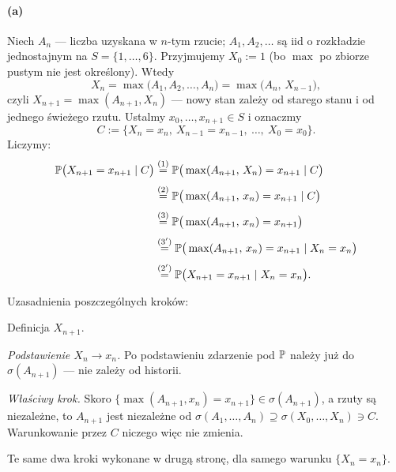 \documentclass[dvipsnames]{book}
\begin{document}
\paragraph{(a)} Niech $A_n$ --- liczba uzyskana w $n$-tym rzucie; $A_1, A_2,
\ldots$ są iid o rozkładzie jednostajnym na $S = \{1, \ldots, 6\}$. Przyjmujemy
$X_0 := 1$ (bo $\max$ po zbiorze pustym nie jest określony). Wtedy
\[
  X_n = \max\big(A_1, A_2, \ldots, A_n\big) = \max\big(A_n,\, X_{n-1}\big),
\]
czyli $X_{n+1} = \max(A_{n+1}, X_n)$ --- nowy stan zależy od starego stanu i od
jednego świeżego rzutu. Ustalmy $x_0, \ldots, x_{n+1} \in S$ i oznaczmy
\[
  C := \{X_n = x_n,\ X_{n-1} = x_{n-1},\ \ldots,\ X_0 = x_0\}.
\]
Liczymy:
\begin{align*}
  \P\big(X_{n+1} = x_{n+1} \mid C\big)
  &\overset{(1)}{=} \P\big(\max(A_{n+1},\, X_n) = x_{n+1} \mid C\big) \\[1mm]
  &\overset{(2)}{=} \P\big(\max(A_{n+1},\, x_n) = x_{n+1} \mid C\big) \\[1mm]
  &\overset{(3)}{=} \P\big(\max(A_{n+1},\, x_n) = x_{n+1}\big) \\[1mm]
  &\overset{(3')}{=} \P\big(\max(A_{n+1},\, x_n) = x_{n+1} \mid X_n = x_n\big) \\[1mm]
  &\overset{(2')}{=} \P\big(X_{n+1} = x_{n+1} \mid X_n = x_n\big).
\end{align*}

Uzasadnienia poszczególnych kroków:
\begin{description}[topsep=2pt,itemsep=1pt,leftmargin=10mm]
  \item[(1)] Definicja $X_{n+1}$.

  \item[(2)] \emph{Podstawienie $X_n \to x_n$.} Po podstawieniu zdarzenie pod $\P$ należy już do
  $\sigma(A_{n+1})$ --- nie zależy od historii.

  \item[(3)] \emph{Właściwy krok.} Skoro
  $\{\max(A_{n+1}, x_n) = x_{n+1}\} \in \sigma(A_{n+1})$, a rzuty są niezależne,
  to $A_{n+1}$ jest niezależne od
  $\sigma(A_1, \ldots, A_n) \supseteq \sigma(X_0, \ldots, X_n) \ni C$.
  Warunkowanie przez $C$ niczego więc nie zmienia.

  \item[(3$'$), (2$'$)] Te same dwa kroki wykonane w drugą stronę, dla samego
  warunku $\{X_n = x_n\}$.
\end{description}
\end{document}
